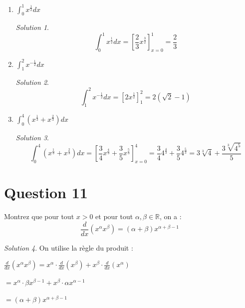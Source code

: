 \documentclass[
  12pt,
  letterpaper,
]{book}
\theoremstyle{remark}
\newtheorem*{solution}{Solution}
\begin{document}
\begin{enumerate}
\item
  \(\int_0^1 x^{\frac{1}{2}}dx\)

  \begin{solution}

  \[\int_0^1 x^{\frac{1}{2}}dx = \left[\frac{2}{3}x^{\frac{3}{2}}\right]_{x=0}^1 = \frac{2}{3}\]

  \end{solution}
\item
  \(\int_1^2 x^{-\frac{1}{2}}dx\)

  \begin{solution}

  \[\int_1^2 x^{-\frac{1}{2}}dx = \left[2x^{\frac{1}{2}}\right]_1^2 = 2\left(\sqrt{2}-1\right)\]

  \end{solution}
\item
  \(\int_0^4 (x^{\frac{1}{3}} + x^{\frac{2}{3}})dx\)

  \begin{solution}

  \[\int_0^4 \left(x^{\frac{1}{3}} + x^{\frac{2}{3}}\right)dx = \left[\frac{3}{4}x^{\frac{4}{3}} + \frac{3}{5}x^{\frac{5}{3}}\right]_{x=0}^4 = \frac{3}{4}4^{\frac{4}{3}} + \frac{3}{5}4^{\frac{5}{3}}=3\sqrt[3]{4}+\frac{3\sqrt[3]{4^5}}{5}\]

  \end{solution}
\end{enumerate}

\hypertarget{question-11-1}{%
\section{Question 11}\label{question-11-1}}

Montrez que pour tout \(x > 0\) et pour tout
\(\alpha,\beta \in \mathbb{R}\), on a :
\[\frac{d}{dx}(x^{\alpha}x^{\beta}) = (\alpha+\beta)x^{\alpha+\beta-1}\]

\begin{solution}

On utilise la règle du produit :

\(\frac{d}{dx}(x^{\alpha}x^{\beta}) = x^{\alpha} \cdot \frac{d}{dx}(x^{\beta}) + x^{\beta} \cdot \frac{d}{dx}(x^{\alpha})\)

\(= x^{\alpha} \cdot \beta x^{\beta-1} + x^{\beta} \cdot \alpha x^{\alpha-1}\)

\(= (\alpha+\beta)x^{\alpha+\beta-1}\)

\end{solution}
\end{document}
